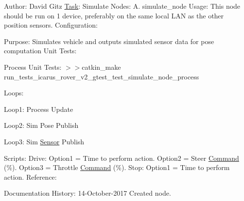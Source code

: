 Author\+: David Gitz \hyperlink{structTask}{Task}\+: Simulate Nodes\+: A. simulate\+\_\+node Usage\+: This node should be run on 1 device, preferably on the same local L\+AN as the other position sensors. Configuration\+:

Purpose\+: Simulates vehicle and outputs simulated sensor data for pose computation Unit Tests\+:
\begin{DoxyEnumerate}
\item Process Unit Tests\+: $>$$>$catkin\+\_\+make run\+\_\+tests\+\_\+icarus\+\_\+rover\+\_\+v2\+\_\+gtest\+\_\+test\+\_\+simulate\+\_\+node\+\_\+process
\end{DoxyEnumerate}

Loops\+:
\begin{DoxyItemize}
\item Loop1\+: Process Update
\item Loop2\+: Sim Pose Publish
\item Loop3\+: Sim \hyperlink{structSensor}{Sensor} Publish
\end{DoxyItemize}

Scripts\+: Drive\+: Option1 = Time to perform action. Option2 = Steer \hyperlink{structCommand}{Command} (\%). Option3 = Throttle \hyperlink{structCommand}{Command} (\%). Stop\+: Option1 = Time to perform action. Reference\+:

Documentation History\+: 14-\/\+October-\/2017 Created node. 